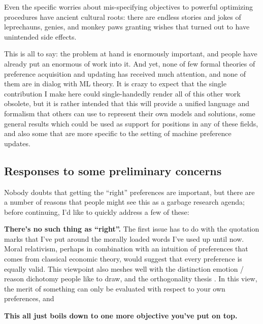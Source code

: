 \documentclass{article}
\begin{document}
	
	Even the specific worries about mis-specifying objectives to powerful optimizing procedures have ancient cultural roots: there are endless stories and jokes of leprechauns, genies, and monkey paws granting wishes that turned out to have unintended side effects. 
	
	This is all to say: the problem at hand is enormously important, and people have already put an enormous of work into it. And yet, none of few formal theories of preference acquisition and updating has received much attention, and none of them are in dialog with ML theory. It is crazy to expect that the single contribution I make here could single-handedly render all of this other work obsolete, but it is rather intended that this will provide a unified language and formalism that others can use to represent their own models and solutions, some general results which could be used as support for positions in any of these fields, and also some that are more specific to the setting of machine preference updates.
		
	\subsection*{Responses to some preliminary concerns}
	Nobody doubts that getting the ``right'' preferences are important, but there are a number of reasons that people might see this as a garbage research agenda; before continuing, I'd like to quickly address a few of these:
	
	\textbf{There's no such thing as ``right''.} The first issue has to do with the quotation marks that I've put around the morally loaded words I've used up until now. Moral relativism, perhaps in combination with an intuition of preferences that comes from classical economic theory, would suggest that every preference is equally valid. This viewpoint also meshes well with the distinction emotion / reason dichotomy people like to draw, and the orthogonality thesis \cite{bostrom2012superintelligent}. In this view, the merit of something can only be evaluated with respect to your own preferences, and 
	
	
	
	\textbf{This all just boils down to one more objective you've put on top.} 
	
\end{document}
